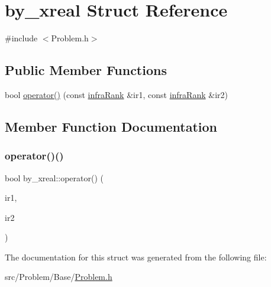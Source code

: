 \hypertarget{structby__xreal}{}\section{by\+\_\+xreal Struct Reference}
\label{structby__xreal}


{\ttfamily \#include $<$Problem.\+h$>$}

\subsection*{Public Member Functions}
\begin{DoxyCompactItemize}
\item 
bool \mbox{\hyperlink{structby__xreal_a89543fd1eb21d028c20e4cd01a239b71_a89543fd1eb21d028c20e4cd01a239b71}{operator()}} (const \mbox{\hyperlink{structinfraRank}{infra\+Rank}} \&ir1, const \mbox{\hyperlink{structinfraRank}{infra\+Rank}} \&ir2)
\end{DoxyCompactItemize}


\subsection{Member Function Documentation}
\mbox{\label{structby__xreal_a89543fd1eb21d028c20e4cd01a239b71_a89543fd1eb21d028c20e4cd01a239b71}} 
\subsubsection{\texorpdfstring{operator()()}{operator()()}}
{\footnotesize\ttfamily bool by\+\_\+xreal\+::operator() (\begin{DoxyParamCaption}\item[{const \mbox{\hyperlink{structinfraRank}{infra\+Rank}} \&}]{ir1,  }\item[{const \mbox{\hyperlink{structinfraRank}{infra\+Rank}} \&}]{ir2 }\end{DoxyParamCaption})\hspace{0.3cm}{\ttfamily [inline]}}



The documentation for this struct was generated from the following file\+:\begin{DoxyCompactItemize}
\item 
src/\+Problem/\+Base/\mbox{\hyperlink{Problem_8h}{Problem.\+h}}\end{DoxyCompactItemize}
